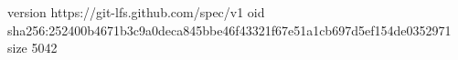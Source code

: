 version https://git-lfs.github.com/spec/v1
oid sha256:252400b4671b3c9a0deca845bbe46f43321f67e51a1cb697d5ef154de0352971
size 5042
